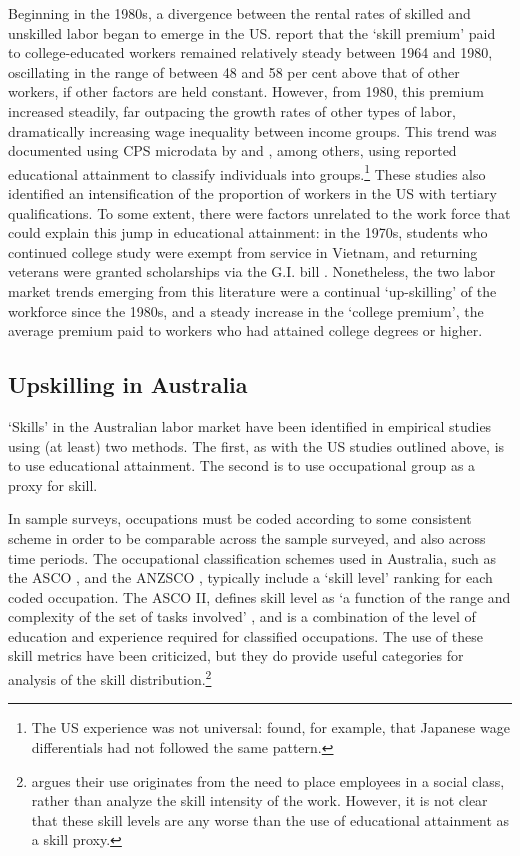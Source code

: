 Beginning in the 1980s, a divergence between the rental rates of skilled and unskilled labor began to emerge in the US. \citet{Acemoglu2011} report that the `skill premium' paid to college-educated workers remained relatively steady between 1964 and 1980, oscillating in the range of between 48 and 58 per cent above that of other workers, if other factors are held constant. However, from 1980, this premium increased steadily, far outpacing the growth rates of other types of labor, dramatically increasing wage inequality between income groups. This trend was documented using CPS microdata by \citet{Karoly1992} and \citet{Katz1989}, among others, using reported educational attainment to classify  individuals into groups.\footnote{The US experience was not universal: \citet{Katz1989} found, for example, that Japanese wage differentials had not followed the same pattern.} These studies also identified an intensification of the proportion of workers in the US with tertiary qualifications. To some extent, there were factors unrelated to the work force that could explain this jump in educational attainment: in the 1970s, students who continued college study were exempt from service in Vietnam, and returning veterans were granted scholarships via the G.I. bill \citep{Acemoglu2011}. Nonetheless, the two labor market trends emerging from this literature were a continual `up-skilling' of the workforce since the 1980s, and a steady increase in the `college premium', the average premium paid to workers who had attained college degrees or higher.

\subsection{Upskilling in Australia}\label{sec:upskillingau}

`Skills' in the Australian labor market have been identified in empirical studies using (at least) two methods. The first, as with the US studies outlined above, is to use educational attainment. The second is to use occupational group as a proxy for skill.

In sample surveys, occupations must be coded according to some consistent scheme in order to be comparable across the sample surveyed, and also across time periods. The occupational classification schemes used in Australia, such as the ASCO \citep{Castles1986}, and the ANZSCO \citep{Trewin2006}, typically include a `skill level' ranking for each coded occupation. The ASCO II, defines skill level as `a function of the range and complexity of the set of tasks involved' \citep[p.14]{Castles1986}, and is a combination of the level of education and experience required for classified occupations. The use of these skill metrics have been criticized, but they do provide useful categories for analysis of the skill distribution.\footnote{\citet{Cully1999} argues their use originates from the need to place employees in a social class, rather than analyze the skill intensity of the work. However, it is not clear that these skill levels are any worse than the use of educational attainment as a skill proxy.}

